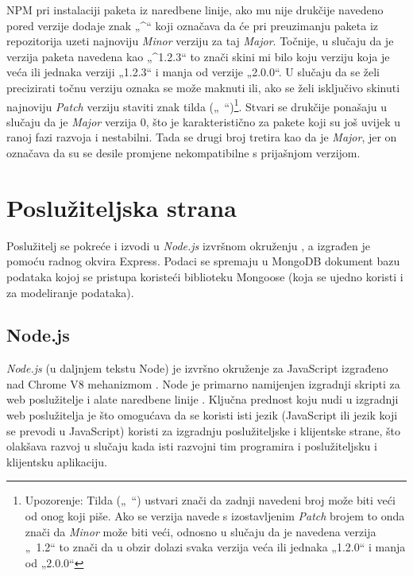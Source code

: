 \documentclass[times, utf8, diplomski, numeric]{fer}
\newcommand{\razmakp}{\vspace{18pt}}
\newcommand{\razmaks}{\vspace{10pt}}
\begin{document}
\razmakp

NPM pri instalaciji paketa iz naredbene linije, ako mu nije drukčije navedeno pored verzije dodaje znak „\string^“ koji označava da će pri preuzimanju paketa iz repozitorija uzeti najnoviju \emph{Minor} verziju za taj \emph{Major}.
Točnije, u slučaju da je verzija paketa navedena kao „\string^1.2.3“ to znači skini mi bilo koju verziju koja je veća ili jednaka verziji „1.2.3“ i manja od verzije „2.0.0“.
U slučaju da se želi precizirati točnu verziju oznaka se može maknuti ili, ako se želi isključivo skinuti najnoviju \emph{Patch} verziju staviti znak tilda („\string~“)\footnote{
    Upozorenje: Tilda („\string~“) ustvari znači da zadnji navedeni broj može biti veći od onog koji piše. Ako se verzija navede s izostavljenim \emph{Patch} brojem to onda znači da \emph{Minor} može biti veći, odnosno u slučaju da je navedena verzija „\string~1.2“ to znači da u obzir dolazi svaka verzija veća ili jednaka „1.2.0“ i manja od „2.0.0“
}.
Stvari se drukčije ponašaju u slučaju da je \emph{Major} verzija 0, što je karakteristično za pakete koji su još uvijek u ranoj fazi razvoja i nestabilni.
Tada se drugi broj tretira kao da je \emph{Major}, jer on označava da su se desile promjene nekompatibilne s prijašnjom verzijom\citep{npm_docs}.


\newpage
\section{Poslužiteljska strana}

Poslužitelj se pokreće i izvodi u \emph{Node.js} izvršnom okruženju , a izgrađen je pomoću radnog okvira  Express.
Podaci se spremaju u MongoDB dokument bazu podataka  kojoj se pristupa koristeći biblioteku Mongoose (koja se ujedno koristi i za modeliranje podataka).


\razmaks
\subsection{Node.js}

\emph{Node.js} (u daljnjem tekstu Node) je izvršno okruženje za JavaScript izgrađeno nad Chrome V8 mehanizmom .
Node je primarno namijenjen izgradnji skripti za web poslužitelje i alate naredbene linije .
Ključna prednost koju nudi u izgradnji web poslužitelja je što omogućava da se koristi isti jezik (JavaScript ili jezik koji se prevodi u JavaScript) koristi za izgradnju poslužiteljske i klijentske strane, što olakšava razvoj u slučaju kada isti razvojni tim programira i poslužiteljsku i klijentsku aplikaciju\citep{wiki_node}.
\end{document}
